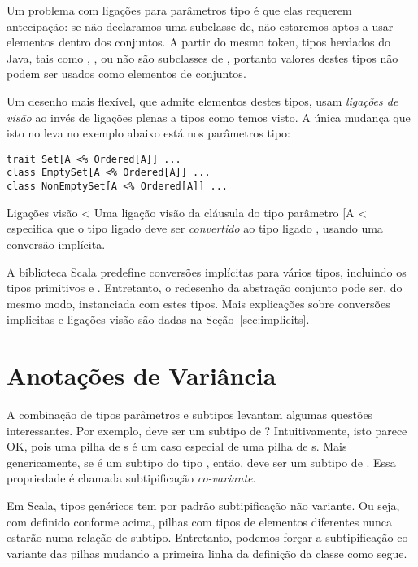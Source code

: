 Um problema com ligações para parâmetros tipo é que elas requerem antecipação:
se não declaramos \lstinline@Num@ uma subclasse de\lstinline@Ordered@, 
não estaremos aptos a usar elementos  \lstinline@Num@ dentro dos conjuntos.
A partir do mesmo token, tipos herdados do Java, tais como \lstinline@Int@, 
\lstinline@Double@, ou \lstinline@String@ não são subclasses de  \lstinline@Ordered@,
portanto valores destes tipos não podem ser usados como elementos de conjuntos.

Um desenho mais flexível, que admite elementos destes tipos, usam {\em ligações de visão} 
ao invés de ligações plenas a tipos como temos visto. A única mudança que isto
no leva no exemplo abaixo está nos parâmetros tipo:

\begin{lstlisting}
trait Set[A <% Ordered[A]] ...
class EmptySet[A <% Ordered[A]] ...
class NonEmptySet[A <% Ordered[A]] ...
\end{lstlisting}
Ligações visão \lstinline@<%@ são mais fracas que ligações plenas \verb@<:@:
Uma ligação visão da cláusula do tipo parâmetro \lstinline@[A <% T]@ somente 
especifica que o tipo ligado \lstinline@A@ deve ser {\em convertido} ao tipo
ligado \lstinline@T@, usando uma conversão implícita.

A biblioteca Scala predefine conversões implícitas para vários tipos, incluindo
os tipos primitivos e \lstinline@String@. Entretanto, o redesenho da abstração conjunto 
pode ser, do mesmo modo,  instanciada com estes tipos. Mais explicações sobre 
conversões implicitas e ligações visão são dadas na Seção~\ref{sec:implicits}.

\section{Anotações de Variância}\label{sec:first-arrays}

A combinação de tipos parâmetros e subtipos levantam algumas questões interessantes.
Por exemplo,  deve ser um subtipo de ? 
Intuitivamente, isto parece OK, pois uma pilha de s é um caso 
especial de uma pilha de s. Mais genericamente, se  é um
subtipo do tipo , então,  deve ser um subtipo de 
. Essa propriedade é chamada subtipificação {\em co-variante}.

Em Scala, tipos genéricos tem por padrão subtipificação não variante. Ou seja, 
com  definido conforme acima, pilhas com tipos de elementos diferentes
nunca estarão numa relação de subtipo. Entretanto, podemos forçar a subtipificação 
co-variante das pilhas mudando a primeira linha da definição da classe 
como segue.

